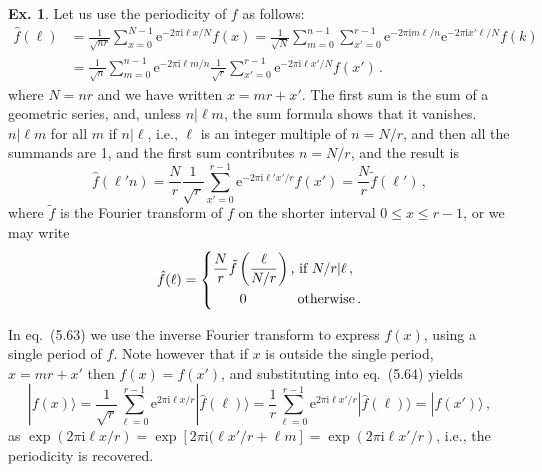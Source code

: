 \documentclass[a4paper,12pt]{article}
\def\e{\mathrm{e}}
\def\imagi{\mathrm{i}}
\theoremstyle{definition}
\newtheorem{exercise}{Ex.}[section]
\begin{document}
\begin{exercise}
 Let us use the periodicity of $f$ as follows:
 \[
  \begin{aligned}
  \hat{f}(\ell) &= \frac{1}{\sqrt{n r}} \sum_{x=0}^{N-1}\e^{-2\pi\imagi \ell x/N}f(x) = \frac{1}{\sqrt{N}}\sum_{m=0}^{n-1} \sum_{x'=0}^{r-1} \e^{-2\pi\imagi m \ell/n}\e^{-2\pi\imagi x' \ell/N}f(k)\\
  &= \frac{1}{\sqrt{n}}\sum_{m=0}^{n-1} \e^{-2\pi\imagi \ell m/n}\frac{1}{\sqrt{r}}\sum_{x'=0}^{r-1}\e^{-2\pi\imagi \ell x'/N} f(x')\,.
 \end{aligned}
 \]
 where $N=n r$ and we have written $x=mr + x'$. The first sum is the sum of a geometric series, and, unless $n | \ell m$, the sum formula shows that it vanishes. $n|\ell m$ for all $m$ if $n|\ell$, i.e., $\ell$ is an integer multiple of $n=N/r$, and then all the summands are 1, and the first sum contributes $n=N/r$, and the result is
 \[
  \hat{f}(\ell' n) = \frac{N}{r}\frac{1}{\sqrt{r}}\sum_{x'=0}^{r-1}\e^{-2\pi\imagi \ell' x'/r}f(x') = \frac{N}{r}\tilde{f}(\ell')\,,
 \]
 where $\tilde{f}$ is the Fourier transform of $f$ on the shorter interval $0\le x\le r-1$, or we may write
 \[
  \hat{f}(\ell) = \left\{
  \begin{aligned}
   \frac{N}{r}\tilde{f}\left(\frac{\ell}{N/r}\right)\,&\text{, if\ } N/r | \ell\,,\\
   0\,\quad\quad\quad&\,\text{\ otherwise\,.} 
  \end{aligned}
  \right.
 \]

 In eq.\ (5.63) we use the inverse Fourier transform to express $f(x)$, using a single period of $f$. Note however that if $x$ is outside the single period, $x=mr+x'$ then $f(x)=f(x')$, and substituting into eq.\ (5.64) yields
 \[
  |f(x)\rangle = \frac{1}{\sqrt{r}}\sum_{\ell=0}^{r-1}\e^{2\pi\imagi \ell x/r}|\hat{f}(\ell)\rangle = \frac{1}{r}\sum_{\ell=0}^{r-1}\e^{2\pi\imagi \ell x'/r}|\hat{f}(\ell)\rangle = |f(x')\rangle\,,
 \]
 as $\exp(2\pi\imagi \ell x /r) = \exp[2\pi\imagi (\ell x'/r + \ell m]=\exp(2\pi\imagi \ell x'/r)$, i.e., the periodicity is recovered.
\end{exercise}
\end{document}
